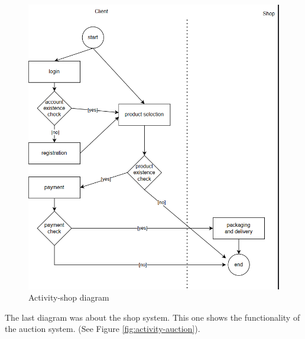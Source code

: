 \begin{figure}[h!]
    \centering
    \includegraphics[scale=0.6]{figures/activity-shop.png}
    \caption{Activity-shop diagram}
    \label{fig:activity-shop}
\end{figure}
\clearpage

The last diagram was about the shop system. This one shows the functionality of the auction system. (See Figure \ref{fig:activity-auction}).

